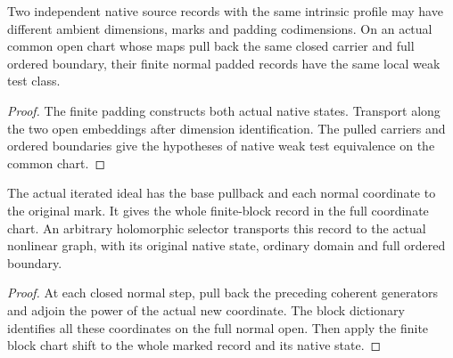 \begin{theorem}
\label{hir:g1-independent-finite-normal-native-class}
\leanok
Two independent native source records with the same
intrinsic profile may have different ambient dimensions,
marks and padding codimensions. On an actual common
open chart whose maps pull back the same closed carrier
and full ordered boundary, their finite normal padded
records have the same local weak test class.
\end{theorem}
\begin{proof}
The finite padding constructs both actual native states.
Transport along the two open embeddings after dimension
identification. The pulled carriers and ordered
boundaries give the hypotheses of native weak test
equivalence on the common chart.
\end{proof}

\begin{theorem}
\label{hir:g1-finite-nonlinear-graph-native-state}
\leanok
The actual iterated ideal has the base pullback and each
normal coordinate to the original mark. It gives the
whole finite-block record in the full coordinate chart.
An arbitrary holomorphic selector transports this record
to the actual nonlinear graph, with its original native
state, ordinary domain and full ordered boundary.
\end{theorem}
\begin{proof}
At each closed normal step, pull back the preceding
coherent generators and adjoin the power of the actual
new coordinate. The block dictionary identifies all
these coordinates on the full normal open. Then apply
the finite block chart shift to the whole marked record
and its native state.
\end{proof}


